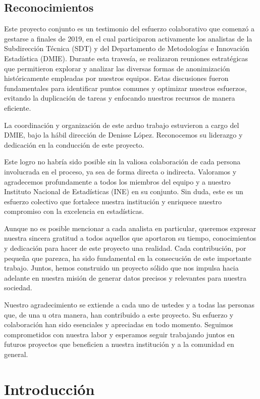 \documentclass[
]{book}
\theoremstyle{definition}
\theoremstyle{definition}
\theoremstyle{definition}
\theoremstyle{definition}
\theoremstyle{remark}
\begin{document}
\hypertarget{reconocimientos}{%
\section{Reconocimientos}\label{reconocimientos}}

Este proyecto conjunto es un testimonio del esfuerzo colaborativo que comenzó a gestarse a finales de 2019, en el cual participaron activamente los analistas de la Subdirección Técnica (SDT) y del Departamento de Metodologías e Innovación Estadística (DMIE). Durante esta travesía, se realizaron reuniones estratégicas que permitieron explorar y analizar las diversas formas de anonimización históricamente empleadas por nuestros equipos. Estas discusiones fueron fundamentales para identificar puntos comunes y optimizar nuestros esfuerzos, evitando la duplicación de tareas y enfocando nuestros recursos de manera eficiente.

La coordinación y organización de este arduo trabajo estuvieron a cargo del DMIE, bajo la hábil dirección de Denisse López. Reconocemos su liderazgo y dedicación en la conducción de este proyecto.

Este logro no habría sido posible sin la valiosa colaboración de cada persona involucrada en el proceso, ya sea de forma directa o indirecta. Valoramos y agradecemos profundamente a todos los miembros del equipo y a nuestro Instituto Nacional de Estadísticas (INE) en su conjunto. Sin duda, este es un esfuerzo colectivo que fortalece nuestra institución y enriquece nuestro compromiso con la excelencia en estadísticas.

Aunque no es posible mencionar a cada analista en particular, queremos expresar nuestra sincera gratitud a todos aquellos que aportaron su tiempo, conocimientos y dedicación para hacer de este proyecto una realidad. Cada contribución, por pequeña que parezca, ha sido fundamental en la consecución de este importante trabajo. Juntos, hemos construido un proyecto sólido que nos impulsa hacia adelante en nuestra misión de generar datos precisos y relevantes para nuestra sociedad.

Nuestro agradecimiento se extiende a cada uno de ustedes y a todas las personas que, de una u otra manera, han contribuido a este proyecto. Su esfuerzo y colaboración han sido esenciales y apreciadas en todo momento. Seguimos comprometidos con nuestra labor y esperamos seguir trabajando juntos en futuros proyectos que beneficien a nuestra institución y a la comunidad en general.

\hypertarget{introducciuxf3n}{%
\chapter{Introducción}\label{introducciuxf3n}}
\end{document}
